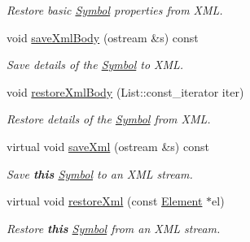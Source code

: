\begin{DoxyCompactItemize}
\begin{DoxyCompactList}\small\item\em Restore basic \mbox{\hyperlink{class_symbol}{Symbol}} properties from X\+ML. \end{DoxyCompactList}\item 
void \mbox{\hyperlink{class_symbol_aa3e9088abdd64c84b7905c29b944a72c}{save\+Xml\+Body}} (ostream \&s) const
\begin{DoxyCompactList}\small\item\em Save details of the \mbox{\hyperlink{class_symbol}{Symbol}} to X\+ML. \end{DoxyCompactList}\item 
void \mbox{\hyperlink{class_symbol_ab569bc89bca664b5a6128209f5f3f167}{restore\+Xml\+Body}} (List\+::const\+\_\+iterator iter)
\begin{DoxyCompactList}\small\item\em Restore details of the \mbox{\hyperlink{class_symbol}{Symbol}} from X\+ML. \end{DoxyCompactList}\item 
virtual void \mbox{\hyperlink{class_symbol_a0ef928814feb0a17fe95d006340eb499}{save\+Xml}} (ostream \&s) const
\begin{DoxyCompactList}\small\item\em Save {\bfseries{this}} \mbox{\hyperlink{class_symbol}{Symbol}} to an X\+ML stream. \end{DoxyCompactList}\item 
virtual void \mbox{\hyperlink{class_symbol_a3266a5752c208bdfa5a28e792de67604}{restore\+Xml}} (const \mbox{\hyperlink{class_element}{Element}} $\ast$el)
\begin{DoxyCompactList}\small\item\em Restore {\bfseries{this}} \mbox{\hyperlink{class_symbol}{Symbol}} from an X\+ML stream. \end{DoxyCompactList}\end{DoxyCompactItemize}
